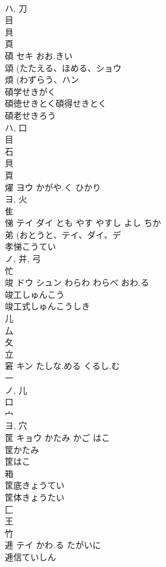 \documentclass[8pt]{extreport}
\begin{document}
\begin{CJK}{UTF8}{min}
\\	ハ, 刀 
\\	目 
\\	貝 
\\	頁 
\\	碩	セキ	おお.きい	
\\	頌 (たたえる、ほめる、ショウ 
\\	煩 (わずらう、ハン 
\\	碩学せきがく
\\	碩徳せきとく碩得せきとく
\\	碩老せきろう
\\	ハ, 口 
\\	目 
\\	石 
\\	貝 
\\	頁 
\\	燿	ヨウ	かがや.く ひかり	
\\	ヨ, 火 
\\	隹 
\\	悌	テイ ダイ	とも やす やすし よし ちか	
\\	弟 (おとうと、テイ、ダイ、デ 
\\	孝悌こうてい 
\\	ノ, 并, 弓 
\\	忙 
\\	竣	ドウ シュン	わらわ わらべ おわ.る	
\\	竣工しゅんこう 
\\	竣工式しゅんこうしき 
\\	儿 
\\	厶 
\\	夂 
\\	立 
\\	窘	キン	たしな.める くるし.む	
\\	一 
\\	ノ, 儿 
\\	口 
\\	宀 
\\	ヨ, 穴 
\\	筐	キョウ	かたみ かご はこ	
\\	筐かたみ
\\	筐はこ 
\\	箱
\\	筐底きょうてい
\\	筐体きょうたい
\\	匚 
\\	王 
\\	竹 
\\	逓	テイ	かわ.る たがいに	
\\	逓信ていしん 

\end{CJK}
\end{document}
